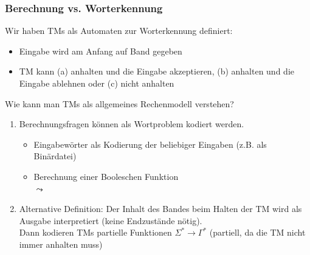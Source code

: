 \documentclass[onlymath]{beamer}
\begin{document}
\begin{frame}\frametitle{Berechnung vs. Worterkennung}

Wir haben TMs als \alert{Automaten zur Worterkennung} definiert:
\begin{itemize}
\item Eingabe wird am Anfang auf Band gegeben
\item TM kann (a) anhalten und die Eingabe akzeptieren, (b) anhalten und die Eingabe ablehnen oder (c) nicht anhalten
\end{itemize}
\bigskip

\alert{Wie kann man TMs als allgemeines Rechenmodell verstehen?}\pause

\begin{enumerate}[(1)]
\item Berechnungsfragen können als Wortproblem kodiert werden.
\begin{itemize}
\item Eingabewörter als Kodierung der beliebiger Eingaben (z.B. als Binärdatei)
\item Berechnung einer Booleschen Funktion\\
$\leadsto$ 
\end{itemize}\pause
%
\item Alternative Definition: Der Inhalt des Bandes beim Halten der TM wird als Ausgabe interpretiert (keine Endzustände nötig).\\
Dann kodieren TMs partielle Funktionen $\Sigma^*\to\Gamma^*$ (partiell, da die TM nicht immer anhalten muss)
\end{enumerate}

\end{frame}
\end{document}
